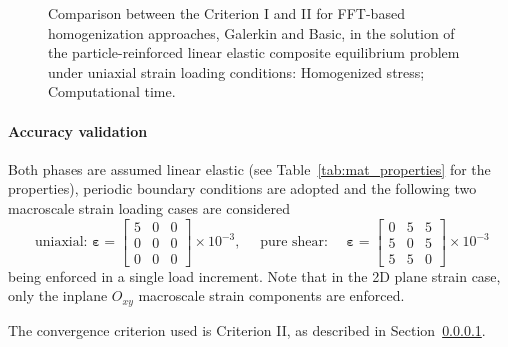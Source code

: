 \begin{figure}[hbt]
\begin{subfigure}[b]{0.46\textwidth}
    \caption{}
    \label{subfig:linear_3D_normal_comparison_crit_cpu_time_vs_n_voxels}
  \end{subfigure}
\caption{Comparison between the Criterion I and II for FFT-based homogenization approaches, Galerkin and Basic, in the
solution of the particle-reinforced linear elastic composite equilibrium problem under uniaxial
strain loading conditions:  Homogenized stress;  Computational time.}
\label{fig:linear_3D_normal_comparison_crit}
\end{figure}

\paragraph{Accuracy validation}
Both phases are assumed linear elastic (see Table~\ref{tab:mat_properties} for the properties), periodic boundary conditions are adopted and the following two macroscale strain loading cases are considered
\begin{equation}
\text { uniaxial: } \bm{\varepsilon}=\left[\begin{array}{lll}
5 & 0 & 0 \\
0 & 0 & 0 \\
0 & 0 & 0
\end{array}\right] \times 10^{-3}, \quad \text { pure shear: } \quad \bm \varepsilon=\left[\begin{array}{ccc}
0 & 5 & 5 \\
5 & 0 & 5 \\
5 & 5 & 0
\end{array}\right] \times 10^{-3}
\end{equation}
being enforced in a single load increment.
Note that in the 2D plane strain case, only the inplane \(O_{x y}\) macroscale strain components are enforced.

The convergence criterion used is Criterion II, as described in Section~\ref{}.


